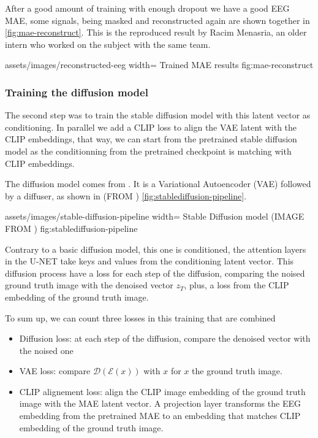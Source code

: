 After a good amount of training with enough dropout we have a good EEG MAE, some
signals, being masked and reconstructed again are shown together in
\cref{fig:mae-reconstruct}. This is the reproduced result by Racim Menasria, an
older intern who worked on the subject with the same team.

\insertfigure
    {assets/images/reconstructed-eeg}
    {width=\textwidth}
    {Trained MAE results}
    {fig:mae-reconstruct}

\subsubsection{Training the diffusion model}

The second step was to train the stable diffusion model with this latent vector
as conditioning. In parallel we add a CLIP \cite{clip} loss to align the VAE
latent with the CLIP embeddings, that way, we can start from the pretrained
stable diffusion model as the conditionning from the pretrained checkpoint is
matching with CLIP embeddings.

The diffusion model comes from \cite{stable-diffusion}. It is a Variational
Autoencoder (VAE) followed by a diffuser, as shown in (FROM
\cite{stable-diffusion}) \cref{fig:stablediffusion-pipeline}.

\insertfigure
    {assets/images/stable-diffusion-pipeline}
    {width=\textwidth}
    {Stable Diffusion model (IMAGE FROM \cite{stable-diffusion})}
    {fig:stablediffusion-pipeline}

Contrary to a basic diffusion model\cite{diffusion}, this one is conditioned,
the attention layers in the U-NET take keys and values from the conditioning
latent vector.  This diffusion process have a loss for each step of the
diffusion, comparing the noised ground truth image with the denoised vector
$z_T$, plus, a loss from the CLIP embedding of the ground truth image.

To sum up, we can count three losses in this training that are combined

\begin{itemize}
    \item Diffusion loss: at each step of the diffusion, compare the denoised
    vector with the noised one

    \item VAE loss: compare $\mathcal{D}(\mathcal{E}(x))$ with $x$ for $x$ the
    ground truth image.
    
    \item CLIP alignement loss: align the CLIP image embedding of the ground
    truth image with the MAE latent vector. A projection layer transforms the
    EEG embedding from the pretrained MAE to an embedding that matches CLIP
    embedding of the ground truth image.
\end{itemize}

